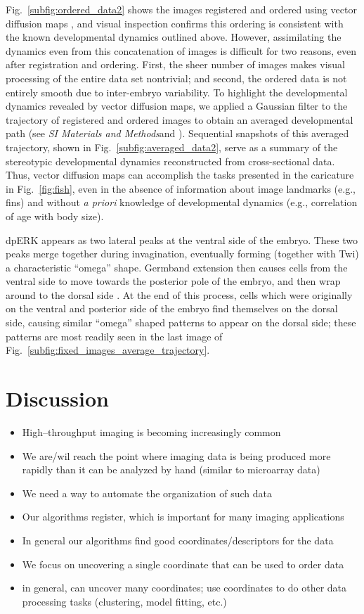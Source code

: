 \documentclass{pnastwo}
\newcommand{\SI}[0]{{\it SI Materials and Methods}}
\newcommand{\fig}[0]{Fig.}
\begin{document}
\begin{article}
\fig~\ref{subfig:ordered_data2} shows the images registered and ordered using vector diffusion maps \cite{singer2012vector}, 
and visual inspection confirms this ordering is consistent with the known developmental dynamics outlined above.
%
However, assimilating the dynamics even from this concatenation of images is difficult for two reasons, even after registration and ordering.
%
First, the sheer number of images makes visual processing of the entire data set nontrivial;
and second, the ordered data is not entirely smooth due to inter-embryo variability.
%
To highlight the developmental dynamics revealed by vector diffusion maps, we applied a Gaussian filter to the trajectory of registered and ordered images to obtain an averaged developmental path (see \SI and  \cite{kemelmacher2011exploring}).  
%
Sequential snapshots of this averaged trajectory, shown in \fig~\ref{subfig:averaged_data2}, serve as a summary of the stereotypic developmental dynamics reconstructed from cross-sectional data.
%
Thus, vector diffusion maps can accomplish the tasks presented in the caricature in \fig~\ref{fig:fish}, even in the absence of information about image landmarks (e.g., fins) and without {\it a priori} knowledge of developmental dynamics (e.g., correlation of age with body size).


%
dpERK appears as two lateral peaks at the ventral side of the embryo.
%
These two peaks merge together during invagination, eventually forming (together with Twi) a characteristic ``omega'' shape.
%
Germband extension then causes cells from the ventral side to move towards the posterior pole of the embryo, and then wrap around to the dorsal side \cite{leptin2005gastrulation}.
%
At the end of this process, cells which were originally on the ventral and posterior side of the embryo find themselves on the dorsal side, causing similar ``omega'' shaped patterns to appear on the dorsal side; these patterns are most readily seen in the last image of \fig~\ref{subfig:fixed_images_average_trajectory}.

\section{Discussion}

\begin{itemize}
\item High--throughput imaging is becoming increasingly common
\item We are/wil reach the point where imaging data is being produced more rapidly than it can be analyzed by hand (similar to microarray data)
\item We need a way to automate the organization of such data
\item Our algorithms register, which is important for many imaging applications
\item In general our algorithms find good coordinates/descriptors for the data
\item We focus on uncovering a single coordinate that can be used to order data
\item in general, can uncover many coordinates; use coordinates to do other data processing tasks (clustering, model fitting, etc.)


\end{itemize}
\end{article}
\end{document}
